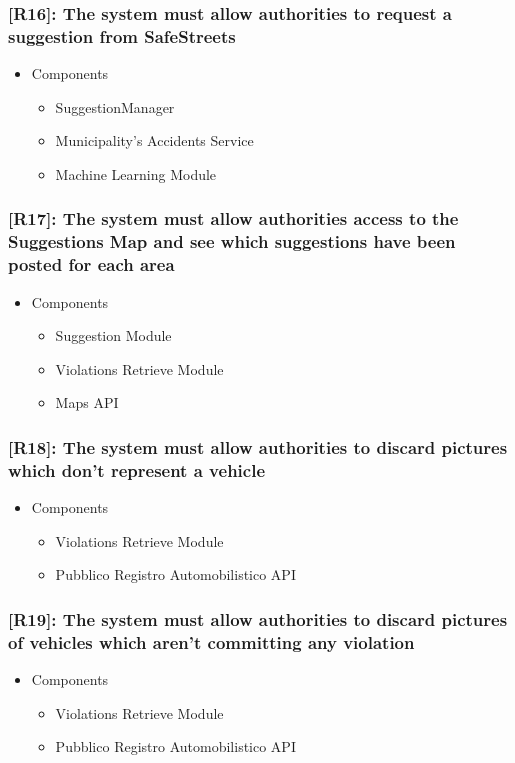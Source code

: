 \documentclass[12pt,a4paper]{article}
\begin{document}
\subsubsection*{[R16]: The system must allow authorities to request a suggestion from SafeStreets}
\begin{itemize}
\item Components
\begin{itemize}
\item SuggestionManager
\item Municipality's Accidents Service
\item Machine Learning Module
\end{itemize}
\end{itemize}
\subsubsection*{[R17]: The system must allow authorities access to the Suggestions Map and see which suggestions have been posted for each area}
\begin{itemize}
\item Components
\begin{itemize}
\item Suggestion Module
\item Violations Retrieve Module
\item Maps API
\end{itemize}
\end{itemize}
\subsubsection*{[R18]: The system must allow authorities to discard pictures which don't represent a vehicle}
\begin{itemize}
\item Components
\begin{itemize}
\item Violations Retrieve Module
\item Pubblico Registro Automobilistico API 
\end{itemize}
\end{itemize}
\subsubsection*{[R19]: The system must allow authorities to discard pictures of vehicles which aren't committing any violation}
\begin{itemize}
\item Components
\begin{itemize}
\item Violations Retrieve Module
\item Pubblico Registro Automobilistico API 
\end{itemize}
\end{itemize}
\newpage
\end{document}
